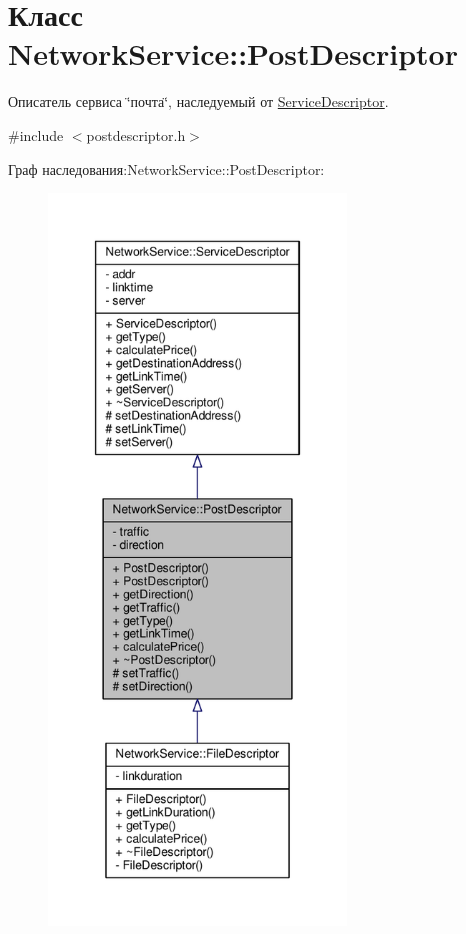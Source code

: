 \hypertarget{class_network_service_1_1_post_descriptor}{}\section{Класс Network\+Service\+:\+:Post\+Descriptor}
\label{class_network_service_1_1_post_descriptor}


Описатель сервиса \char`\"{}почта\char`\"{}, наследуемый от \hyperlink{class_network_service_1_1_service_descriptor}{Service\+Descriptor}.  




{\ttfamily \#include $<$postdescriptor.\+h$>$}



Граф наследования\+:Network\+Service\+:\+:Post\+Descriptor\+:\nopagebreak
\begin{figure}[H]
\begin{center}
\leavevmode
\includegraphics[height=550pt]{class_network_service_1_1_post_descriptor__inherit__graph}
\end{center}
\end{figure}


